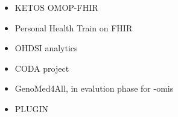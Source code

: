 \documentclass[
  authoryear]{elsarticle}
\providecommand{\tightlist}{%
  \setlength{\itemsep}{0pt}\setlength{\parskip}{0pt}}\usepackage{longtable,booktabs,array}
\begin{document}
\begin{itemize}
\tightlist
\item
  KETOS OMOP-FHIR \citep{gruendner2019ketos}
\item
  Personal Health Train on FHIR \citep{choudhury2020personal}
\item
  OHDSI analytics \citep{khalid2021standardized}
\item
  CODA project \citep{mullie2023coda}
\item
  GenoMed4All, in evalution phase for -omis \citep{cremonesi2023need}
\item
  PLUGIN
\end{itemize}


  
\end{document}
